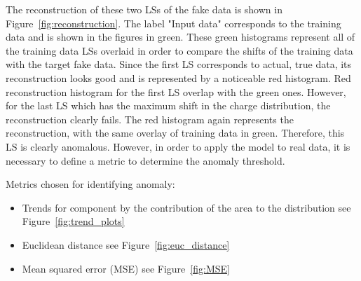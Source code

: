 The reconstruction of these two LSs of the fake data is shown in Figure~\ref{fig:reconstruction}. The label "Input data" corresponds to the training data and is shown in the figures in green. These green histograms represent all of the training data LSs overlaid in order to compare the shifts of the training data with the target fake data. Since the first LS corresponds to actual, true data, its reconstruction looks good and is represented by a noticeable red histogram. Red reconstruction histogram for the first LS overlap with the green ones. However, for the last LS which has the maximum shift in the charge distribution, the reconstruction clearly fails. The red histogram again represents the reconstruction, with the same overlay of training data in green. Therefore, this LS is clearly anomalous. However, in order to apply the model to real data, it is necessary to define a metric to determine the anomaly threshold.

Metrics chosen for identifying anomaly:
\begin{itemize}
    \item Trends for component by the contribution of the area to the distribution see Figure~\ref{fig:trend_plots}
    \item Euclidean distance see Figure~\ref{fig:euc_distance}
    \item Mean squared error (MSE) see Figure~\ref{fig:MSE}
\end{itemize}

